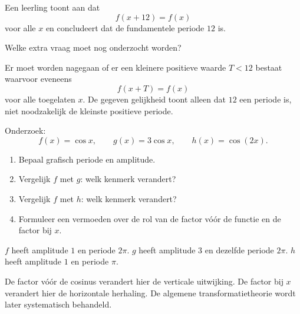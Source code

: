 \documentclass{ximera}
\begin{document}
\begin{oefening}{\oefG}

Een leerling toont aan dat
\[
f(x+12)=f(x)
\]
voor alle \(x\) en concludeert dat de fundamentele periode \(12\) is.

Welke extra vraag moet nog onderzocht worden?

\begin{oplossing}
Er moet worden nagegaan of er een kleinere positieve waarde \(T<12\) bestaat
waarvoor eveneens
\[
f(x+T)=f(x)
\]
voor alle toegelaten \(x\). De gegeven gelijkheid toont alleen dat \(12\)
een periode is, niet noodzakelijk de kleinste positieve periode.
\end{oplossing}
\end{oefening}

\begin{oefening}{\oefG}

Onderzoek:
\[
f(x)=\cos x,\qquad
g(x)=3\cos x,\qquad
h(x)=\cos(2x).
\]

\begin{enumerate}
  \item Bepaal grafisch periode en amplitude.
  \item Vergelijk \(f\) met \(g\): welk kenmerk verandert?
  \item Vergelijk \(f\) met \(h\): welk kenmerk verandert?
  \item Formuleer een vermoeden over de rol van de factor vóór de functie
        en de factor bij \(x\).
\end{enumerate}

\begin{oplossing}
\(f\) heeft amplitude \(1\) en periode \(2\pi\).
\(g\) heeft amplitude \(3\) en dezelfde periode \(2\pi\).
\(h\) heeft amplitude \(1\) en periode \(\pi\).

De factor vóór de cosinus verandert hier de verticale uitwijking.
De factor bij \(x\) verandert hier de horizontale herhaling.
De algemene transformatietheorie wordt later systematisch behandeld.
\end{oplossing}
\end{oefening}
\end{document}
